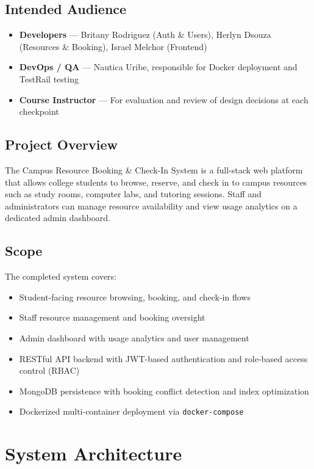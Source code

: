 \documentclass[12pt]{article}
\begin{document}
\subsection{Intended Audience}
\begin{itemize}
    \item \textbf{Developers} --- Britany Rodriguez (Auth \& Users), Herlyn Dsouza (Resources \& Booking), Israel Melchor (Frontend)
    \item \textbf{DevOps / QA} --- Nautica Uribe, responsible for Docker deployment and TestRail testing
    \item \textbf{Course Instructor} --- For evaluation and review of design decisions at each checkpoint
\end{itemize}

\subsection{Project Overview}
The Campus Resource Booking \& Check-In System is a full-stack web platform that allows college students to browse, reserve, and check in to campus resources such as study rooms, computer labs, and tutoring sessions. Staff and administrators can manage resource availability and view usage analytics on a dedicated admin dashboard.

\subsection{Scope}
The completed system covers:
\begin{itemize}
    \item Student-facing resource browsing, booking, and check-in flows
    \item Staff resource management and booking oversight
    \item Admin dashboard with usage analytics and user management
    \item RESTful API backend with JWT-based authentication and role-based access control (RBAC)
    \item MongoDB persistence with booking conflict detection and index optimization
    \item Dockerized multi-container deployment via \texttt{docker-compose}
\end{itemize}

\section{System Architecture}
\end{document}
